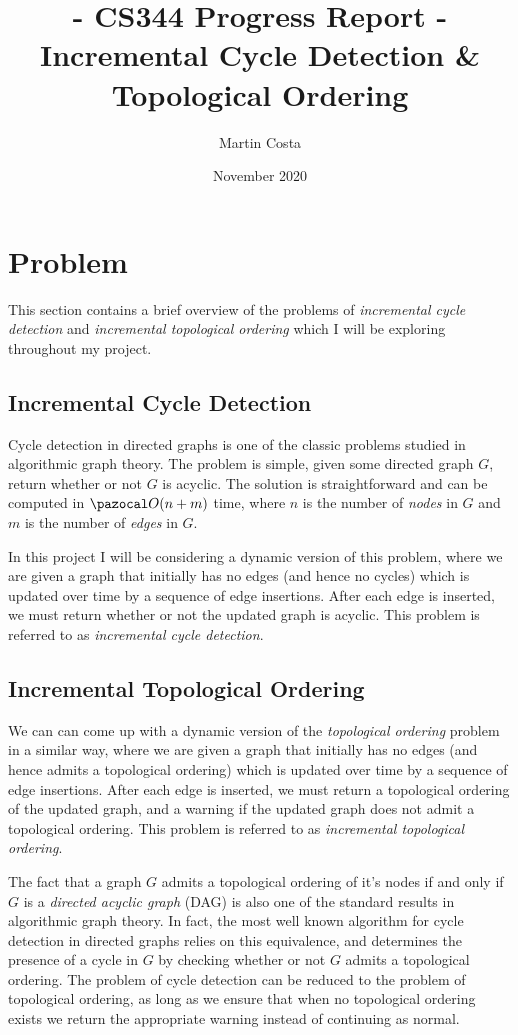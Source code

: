 \documentclass{article}
\title{- CS344 Progress Report - \\  Incremental Cycle Detection \& Topological Ordering }
\author{Martin Costa}
\date{November 2020}
\begin{document}
\maketitle

\section{Problem}

This section contains a brief overview of the problems of \textit{incremental cycle detection} and \textit{incremental topological ordering} which I will be exploring throughout my project.

\subsection{Incremental Cycle Detection}

Cycle detection in directed graphs is one of the classic problems studied in algorithmic graph theory. The problem is simple, given some directed graph $G$, return whether or not $G$ is acyclic. The solution is straightforward and can be computed in $\pazocal O(n+m)$ time, where $n$ is the number of \textit{nodes} in $G$ and $m$ is the number of \textit{edges} in $G$.

In this project I will be considering a dynamic version of this problem, where we are given a graph that initially has no edges (and hence no cycles) which is updated over time by a sequence of edge insertions. After each edge is inserted, we must return whether or not the updated graph is acyclic. This problem is referred to as \textit{incremental cycle detection}.

\subsection{Incremental Topological Ordering}

We can can come up with a dynamic version of the \textit{topological ordering} problem in a similar way, where we are given a graph that initially has no edges (and hence admits a topological ordering) which is updated over time by a sequence of edge insertions. After each edge is inserted, we must return a topological ordering of the updated graph, and a warning if the updated graph does not admit a topological ordering. This problem is referred to as \textit{incremental topological ordering}.

The fact that a graph $G$ admits a topological ordering of it's nodes if and only if $G$ is a \textit{directed acyclic graph} (DAG) is also one of the standard results in algorithmic graph theory. In fact, the most well known algorithm for cycle detection in directed graphs relies on this equivalence, and determines the presence of a cycle in $G$ by checking whether or not $G$ admits a topological ordering. The problem of cycle detection can be reduced to the problem of topological ordering, as long as we ensure that when no topological ordering exists we return the appropriate warning instead of continuing as normal.
\end{document}
